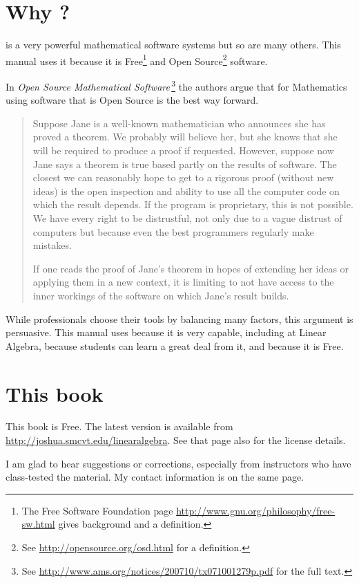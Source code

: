 \section{Why \Sage?}
\Sage{} is a very powerful mathematical software systems but so are
many others.
This manual uses it because it is 
Free\footnote{The Free Software Foundation page 
\protect\url{http://www.gnu.org/philosophy/free-sw.html} 
gives background and a definition.} 
and Open Source\footnote{See \protect\url{http://opensource.org/osd.html} 
for a definition.} 
software.

In 
\textit{Open Source Mathematical Software\,}\citep{JoynerStein07}\footnote{See 
\protect\url{http://www.ams.org/notices/200710/tx071001279p.pdf} for the 
full text.}
the authors argue that for Mathematics using software that is Open Source
is the best way forward.

\begin{quotation}\small
Suppose Jane is a well-known mathematician who announces
she has proved a theorem. We probably will believe
her, but she knows that she will be required to produce
a proof if requested. However, suppose now Jane says a
theorem is true based partly on the results of software. The
closest we can reasonably hope to get to a rigorous proof
(without new ideas) is the open inspection and ability to use
all the computer code on which the result depends. If the
program is proprietary, this is not possible. We have every
right to be distrustful, not only due to a vague distrust of
computers but because even the best programmers regularly
make mistakes.

If one reads the proof of Jane’s theorem in hopes of
extending her ideas or applying them in a new context, it
is limiting to not have access to the inner workings of the
software on which Jane’s result builds.
\end{quotation}  
While professionals choose their tools by balancing many factors,
this argument is persuasive.
This manual uses \Sage{} because it is very capable, 
including at Linear Algebra, because students can 
learn a great deal from it,
and because it is Free.


\section{This book}
This book is Free.
The latest version is available from 
\url{http://joshua.smcvt.edu/linearalgebra}.
See that page also for the license details.

I am glad to hear suggestions or corrections, especially from instructors
who have class-tested the material.
My contact information is on the same page. 


